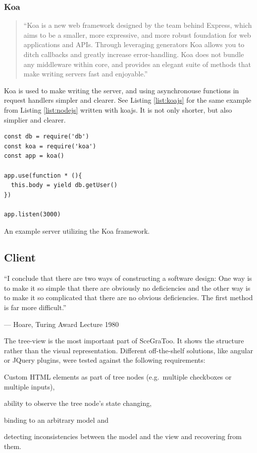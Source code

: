 \subsubsection{Koa}
\label{par:Koa}
\begin{quote}
  ``Koa is a new web framework designed by the team behind Express, which aims to be a smaller, more expressive, and more robust foundation for web applications and APIs. Through leveraging generators Koa allows you to ditch callbacks and greatly increase error-handling. Koa does not bundle any middleware within core, and provides an elegant suite of methods that make writing servers fast and enjoyable.'' \cite{koajs}
\end{quote}

Koa is used to make writing the server, and using asynchronouse functions in request handlers simpler and clearer.
See Listing \ref{list:koajs} for the same example from Listing \ref{list:nodejs} written with koajs.
It is not only shorter, but also simplier and clearer.

\begin{listing}
  \begin{verbatim}
const db = require('db')
const koa = require('koa')
const app = koa()

app.use(function * (){
  this.body = yield db.getUser()
})

app.listen(3000)
  \end{verbatim}
  \caption{An example server utilizing the Koa framework.}
  \label{list:koajs}
\end{listing}

\subsection{Client}
\label{client}

\epigraph{``I conclude that there are two ways of constructing a software design:
One way is to make it so simple that there are obviously no deficiencies
and the other way is to make it so complicated that there are no obvious
deficiencies. The first method is far more difficult.''}{--- Hoare, Turing Award Lecture 1980}

The tree-view is the most important part of SceGraToo. It shows the
structure rather than the visual representation. Different
off-the-shelf solutions, like angular or JQuery plugins, were tested
against the following requirements:

\begin{enumerate*}
  \item Custom \gls{HTML} elements as part of tree nodes (e.g.~multiple checkboxes or multiple inputs),
  \item ability to observe the tree node's state changing,
  \item binding to an arbitrary model and
  \item detecting inconsistencies between the model and the view and recovering from them.
\end{enumerate*}

